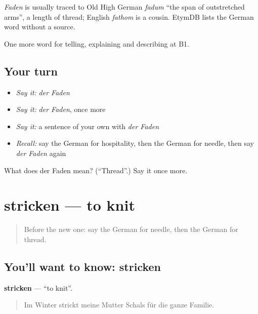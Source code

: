 \begin{cousinweb}
\emph{Faden} is usually traced to Old High German \emph{fadum} \textquotedblleft{}the span of outstretched arms\textquotedblright{}, a length of thread; English \emph{fathom} is a cousin. EtymDB lists the German word without a source.
\end{cousinweb}

\begin{grammarlens}[title={What you've built}]
One more word for telling, explaining and describing at B1.
\end{grammarlens}

\subsection*{Your turn}
\begin{itemize}
\raggedright
  \item \emph{Say it:} \emph{der Faden}
  \item \emph{Say it:} \emph{der Faden}, once more
  \item \emph{Say it:} a sentence of your own with \emph{der Faden}
  \item \emph{Recall:} say the German for hospitality, then the German for needle, then say \emph{der Faden} again
\end{itemize}

\begin{tcolorbox}[breakable,colback=teal!4,colframe=teal!35!black,title={Before you move on}]
What does der Faden mean? (\textquotedblleft{}Thread\textquotedblright{}.) Say it once more.
\end{tcolorbox}
\section[stricken]{stricken — to knit}

\label{lesson:GE-C499-stricken}



\begin{quote}
Before the new one: say the German for needle, then the German for thread.
\end{quote}

\subsection*{You'll want to know: stricken}
\textbf{stricken} — \textquotedblleft{}to knit\textquotedblright{}.

\begin{quote}
Im Winter strickt meine Mutter Schals für die ganze Familie.
\end{quote}

